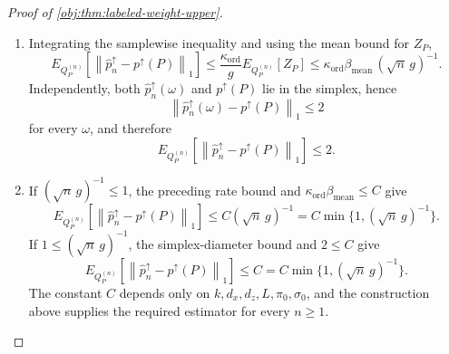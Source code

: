 \begin{proof}[Proof of \cref{obj:thm:labeled-weight-upper}]
\begin{enumerate}
\item
Integrating the samplewise inequality and using the mean bound for \(Z_P\),
\[
E_{Q_P^{(n)}}\!\left[
\left\|\widehat p_n^{\uparrow}-p^{\uparrow}(P)\right\|_1
\right]
\le
\frac{\kappa_{\mathrm{ord}}}{g}E_{Q_P^{(n)}}[Z_P]
\le
\kappa_{\mathrm{ord}}\beta_{\mathrm{mean}}\,
(\sqrt n\,g)^{-1}.
\]
Independently, both \(\widehat p_n^{\uparrow}(\omega)\) and \(p^{\uparrow}(P)\) lie in the simplex, hence
\[
\left\|\widehat p_n^{\uparrow}(\omega)-p^{\uparrow}(P)\right\|_1\le2
\]
for every \(\omega\), and therefore
\[
E_{Q_P^{(n)}}\!\left[
\left\|\widehat p_n^{\uparrow}-p^{\uparrow}(P)\right\|_1
\right]\le2 .
\] %

\item
If \((\sqrt n\,g)^{-1}\le1\), the preceding rate bound and
\(\kappa_{\mathrm{ord}}\beta_{\mathrm{mean}}\le C\) give
\[
E_{Q_P^{(n)}}\!\left[
\left\|\widehat p_n^{\uparrow}-p^{\uparrow}(P)\right\|_1
\right]
\le
C(\sqrt n\,g)^{-1}
=
C\min\{1,(\sqrt n\,g)^{-1}\}.
\]
If \(1\le(\sqrt n\,g)^{-1}\), the simplex-diameter bound and \(2\le C\) give
\[
E_{Q_P^{(n)}}\!\left[
\left\|\widehat p_n^{\uparrow}-p^{\uparrow}(P)\right\|_1
\right]
\le
C
=
C\min\{1,(\sqrt n\,g)^{-1}\}.
\]
The constant \(C\) depends only on \(k,d_x,d_z,L,\pi_0,\sigma_0\), and the construction above supplies the required estimator for every \(n\ge1\). %
\end{enumerate}
\end{proof}

